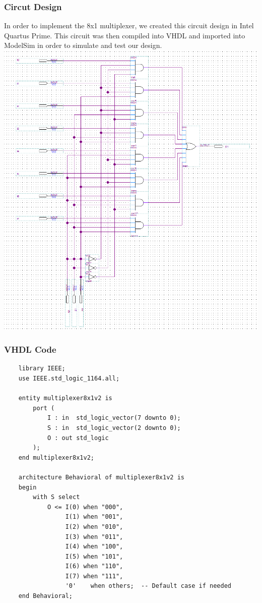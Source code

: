 \documentclass[12pt]{article}
\begin{document}
\subsubsection{Circut Design}
In order to implement the 8x1 multiplexer, we created this circuit design in Intel Quartus Prime.
This circuit was then compiled into VHDL and imported into ModelSim in order to simulate and test our design. \\
\includegraphics[width=\textwidth]{8x1multiplexer.png}
\clearpage
\subsubsection{VHDL Code}
\begin{verbatim}
    library IEEE;
    use IEEE.std_logic_1164.all;
    
    entity multiplexer8x1v2 is
        port (
            I : in  std_logic_vector(7 downto 0);
            S : in  std_logic_vector(2 downto 0);
            O : out std_logic
        );
    end multiplexer8x1v2;
    
    architecture Behavioral of multiplexer8x1v2 is
    begin
        with S select
            O <= I(0) when "000",
                 I(1) when "001",
                 I(2) when "010",
                 I(3) when "011",
                 I(4) when "100",
                 I(5) when "101",
                 I(6) when "110",
                 I(7) when "111",
                 '0'    when others;  -- Default case if needed
    end Behavioral;
\end{verbatim}
\clearpage
\end{document}
